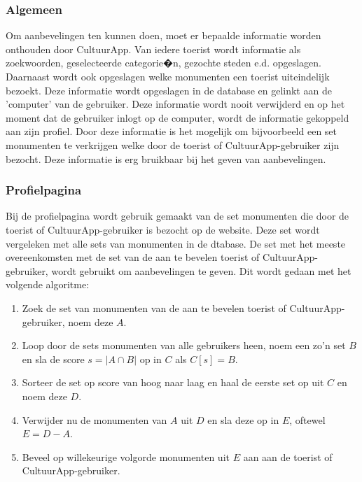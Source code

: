 \documentclass[a4paper,10pt]{article}
\begin{document}
		\subsubsection{Algemeen}
		Om aanbevelingen ten kunnen doen, moet er bepaalde informatie worden onthouden door CultuurApp. Van iedere toerist wordt informatie als zoekwoorden, geselecteerde categorie�n, gezochte steden e.d. opgeslagen. Daarnaast wordt ook opgeslagen welke monumenten een toerist uiteindelijk bezoekt. Deze informatie wordt opgeslagen in de database en gelinkt aan de 'computer' van de gebruiker. Deze informatie wordt nooit verwijderd en op het moment dat de gebruiker inlogt op de computer, wordt de informatie gekoppeld aan zijn profiel. Door deze informatie is het mogelijk om bijvoorbeeld een set monumenten te verkrijgen welke door de toerist of CultuurApp-gebruiker zijn bezocht. Deze informatie is erg bruikbaar bij het geven van aanbevelingen.
	
		\subsubsection{Profielpagina}
		Bij de profielpagina wordt gebruik gemaakt van de set monumenten die door de toerist of CultuurApp-gebruiker is bezocht op de website. Deze set wordt vergeleken met alle sets van monumenten in de dtabase. De set met het meeste overeenkomsten met de set van de aan te bevelen toerist of CultuurApp-gebruiker, wordt gebruikt om aanbevelingen te geven. Dit wordt gedaan met het volgende algoritme:
		\begin{enumerate}
			\item Zoek de set van monumenten van de aan te bevelen toerist of CultuurApp-gebruiker, noem deze $A$.
			\item Loop door de sets monumenten van alle gebruikers heen, noem een zo'n set $B$ en sla de score $s = |A \cap B|$ op in $C$ als $C\left[s\right] = B$.
			\item Sorteer de set op score van hoog naar laag en haal de eerste set op uit $C$ en noem deze $D$.
			\item Verwijder nu de monumenten van $A$ uit $D$ en sla deze op in $E$, oftewel $E = D - A$.
			\item Beveel op willekeurige volgorde monumenten uit $E$ aan aan de toerist of CultuurApp-gebruiker.
		\end{enumerate}
		
\end{document}
